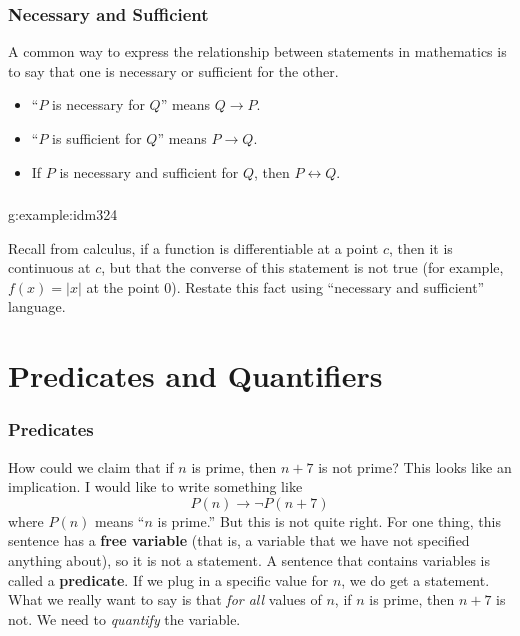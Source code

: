 \documentclass[11pt, compress]{beamer}
\newcommand{\terminology}[1]{\textbf{#1}}\newcommand{\lt}{<}
\renewcommand{\iff}{\leftrightarrow}
\newcommand{\imp}{\rightarrow}
\begin{document}
\begin{frame}
\frametitle{Necessary and Sufficient}
 
A common way to express the relationship between statements in mathematics is to say that one is necessary or sufficient for the other.\pause 
\begin{itemize}[<+->]
\item{}``\(P\) is necessary for \(Q\)'' means \(Q \imp P\).

\item{}``\(P\) is sufficient for \(Q\)'' means \(P \imp Q\).

\item{}
If \(P\) is necessary and sufficient for \(Q\), then \(P \iff Q\).
\end{itemize}\end{frame}
 
\begin{frame}
\frametitle{}
\begin{example}{}{g:example:idm324}%

Recall from calculus, if a function is differentiable at a point \(c\), then it is continuous at \(c\), but that the converse of this statement is not true (for example, \(f(x) = |x|\) at the point 0). Restate this fact using ``necessary and sufficient'' language.\end{example}
\end{frame}
 


\section{Predicates and Quantifiers}
\begin{frame}
\frametitle{Predicates}
 
 How could we claim that if \(n\) is prime, then \(n+7\) is not prime? This looks like an implication. I would like to write something like%
\begin{equation*}
P(n) \imp \neg P(n+7)
\end{equation*}
where \(P(n)\) means ``\(n\) is prime.'' But this is not quite right. 
\pause 
For one thing, this sentence has a \terminology{free variable} (that is, a variable that we have not specified anything about), so it is not a statement.  A sentence that contains variables is called a \terminology{predicate}. 
\pause 
If we plug in a specific value for \(n\), we do get a statement. What we really want to say is that \emph{for all} values of \(n\), if \(n\) is prime, then \(n+7\) is not. We need to \emph{quantify} the variable.\end{frame}
 
\end{document}
